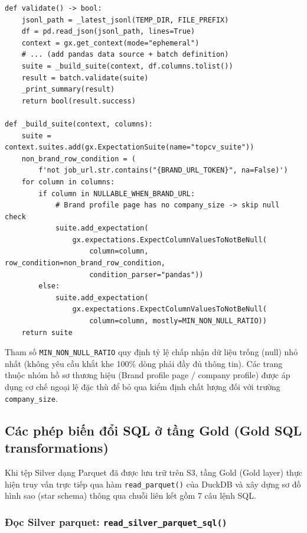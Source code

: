 \begin{lstlisting}[style=pystyle, caption={GX validation: ExpectColumnValuesToNotBeNull}, label={lst:gx-validate}]
def validate() -> bool:
    jsonl_path = _latest_jsonl(TEMP_DIR, FILE_PREFIX)
    df = pd.read_json(jsonl_path, lines=True)
    context = gx.get_context(mode="ephemeral")
    # ... (add pandas data source + batch definition)
    suite = _build_suite(context, df.columns.tolist())
    result = batch.validate(suite)
    _print_summary(result)
    return bool(result.success)

def _build_suite(context, columns):
    suite = context.suites.add(gx.ExpectationSuite(name="topcv_suite"))
    non_brand_row_condition = (
        f'not job_url.str.contains("{BRAND_URL_TOKEN}", na=False)')
    for column in columns:
        if column in NULLABLE_WHEN_BRAND_URL:
            # Brand profile page has no company_size -> skip null check
            suite.add_expectation(
                gx.expectations.ExpectColumnValuesToNotBeNull(
                    column=column, row_condition=non_brand_row_condition,
                    condition_parser="pandas"))
        else:
            suite.add_expectation(
                gx.expectations.ExpectColumnValuesToNotBeNull(
                    column=column, mostly=MIN_NON_NULL_RATIO))
    return suite
\end{lstlisting}

Tham số \texttt{MIN\_NON\_NULL\_RATIO} quy định tỷ lệ chấp nhận dữ liệu trống (null) nhỏ nhất
(không yêu cầu khắt khe 100\% dòng phải đầy đủ thông tin). Các trang thuộc nhóm hồ sơ thương hiệu (Brand profile page / company profile)
được áp dụng cơ chế ngoại lệ đặc thù để bỏ qua kiểm định chất lượng đối với trường \texttt{company\_size}.


\subsection{Các phép biến đổi SQL ở tầng Gold (Gold SQL transformations)}
\label{subsec:gold-sql}

Khi tệp Silver dạng Parquet đã được lưu trữ trên S3, tầng Gold (Gold layer) thực hiện truy vấn trực tiếp qua hàm \texttt{read\_parquet()}
của DuckDB và xây dựng sơ đồ hình sao (star schema) thông qua chuỗi liên kết gồm 7 câu lệnh SQL.

\subsubsection{Đọc Silver parquet: \texttt{read\_silver\_parquet\_sql()}}

